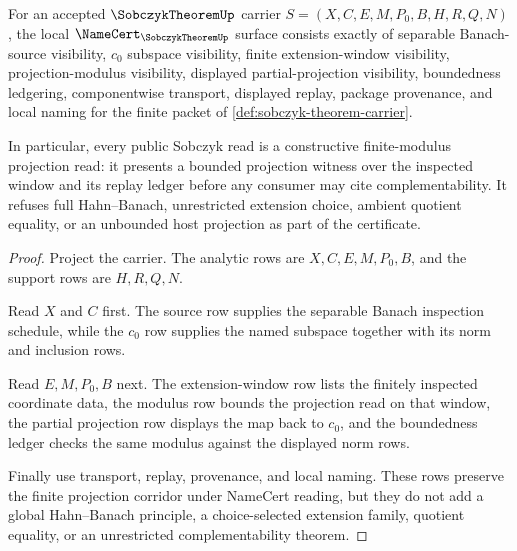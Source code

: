 \begin{theorem}
\label{thm:sobczyk-theorem-namecert-obligations}
For an accepted $\SobczykTheoremUp$ carrier $S=(X,C,E,M,P_0,B,H,R,Q,N)$, the local $\NameCert_{\SobczykTheoremUp}$ surface consists exactly of separable Banach-source visibility, $c_0$ subspace visibility, finite extension-window visibility, projection-modulus visibility, displayed partial-projection visibility, boundedness ledgering, componentwise transport, displayed replay, package provenance, and local naming for the finite packet of \autoref{def:sobczyk-theorem-carrier}.

In particular, every public Sobczyk read is a constructive finite-modulus projection read: it presents a bounded projection witness over the inspected window and its replay ledger before any consumer may cite complementability. It refuses full Hahn--Banach, unrestricted extension choice, ambient quotient equality, or an unbounded host projection as part of the certificate.
\end{theorem}
\begin{proof}
Project the carrier. The analytic rows are $X,C,E,M,P_0,B$, and the support rows are $H,R,Q,N$.

Read $X$ and $C$ first. The source row supplies the separable Banach inspection schedule, while the $c_0$ row supplies the named subspace together with its norm and inclusion rows.

Read $E,M,P_0,B$ next. The extension-window row lists the finitely inspected coordinate data, the modulus row bounds the projection read on that window, the partial projection row displays the map back to $c_0$, and the boundedness ledger checks the same modulus against the displayed norm rows.

Finally use transport, replay, provenance, and local naming. These rows preserve the finite projection corridor under NameCert reading, but they do not add a global Hahn--Banach principle, a choice-selected extension family, quotient equality, or an unrestricted complementability theorem.
\end{proof}



